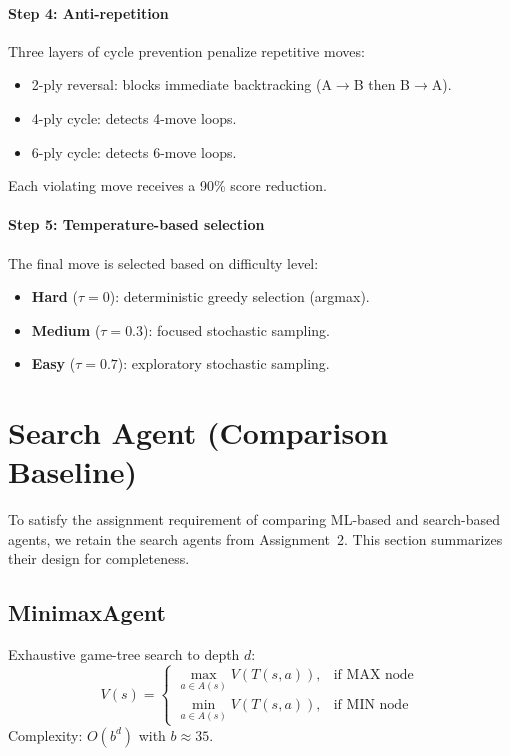 \documentclass[a4paper,12pt]{article}
\begin{document}
\paragraph{Step 4: Anti-repetition}
Three layers of cycle prevention penalize repetitive moves:
\begin{itemize}
    \item 2-ply reversal: blocks immediate backtracking (A$\to$B then B$\to$A).
    \item 4-ply cycle: detects 4-move loops.
    \item 6-ply cycle: detects 6-move loops.
\end{itemize}
Each violating move receives a 90\% score reduction.

\paragraph{Step 5: Temperature-based selection}
The final move is selected based on difficulty level:
\begin{itemize}
    \item \textbf{Hard} ($\tau = 0$): deterministic greedy selection (argmax).
    \item \textbf{Medium} ($\tau = 0.3$): focused stochastic sampling.
    \item \textbf{Easy} ($\tau = 0.7$): exploratory stochastic sampling.
\end{itemize}



\section{Search Agent (Comparison Baseline)}

To satisfy the assignment requirement of comparing ML-based and search-based agents, we retain the search agents from Assignment~2. This section summarizes their design for completeness.

\subsection{MinimaxAgent}

Exhaustive game-tree search to depth $d$:
\[
V(s) =
\begin{cases}
\max\limits_{a \in A(s)} V(T(s,a)), & \text{if MAX node} \\
\min\limits_{a \in A(s)} V(T(s,a)), & \text{if MIN node}
\end{cases}
\]
Complexity: $O(b^d)$ with $b \approx 35$.
\end{document}

